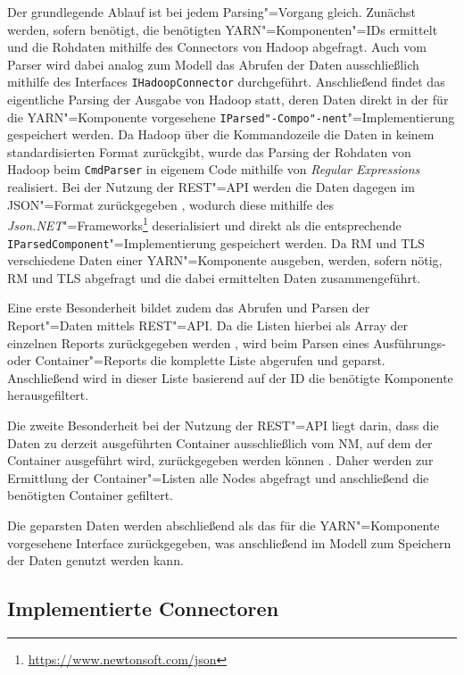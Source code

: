 Der grundlegende Ablauf ist bei jedem Parsing"=Vorgang gleich.
Zunächst werden, sofern benötigt, die benötigten YARN"=Komponenten"=IDs ermittelt und die Rohdaten mithilfe des Connectors von Hadoop abgefragt.
Auch vom Parser wird dabei analog zum Modell das Abrufen der Daten ausschließlich mithilfe des Interfaces \texttt{IHadoopConnector} durchgeführt.
Anschließend findet das eigentliche Parsing der Ausgabe von Hadoop statt, deren Daten direkt in der für die YARN"=Komponente vorgesehene \texttt{IParsed"-Compo"-nent}"=Implementierung gespeichert werden.
Da Hadoop über die Kommandozeile die Daten in keinem standardisierten Format zurückgibt, wurde das Parsing der Rohdaten von Hadoop beim \texttt{CmdParser} in eigenem Code mithilfe von \emph{Regular Expressions} realisiert.
Bei der Nutzung der REST"=API werden die Daten dagegen im JSON"=Format zurückgegeben \cite{HadoopYarnTlServer271,HadoopRmApi271,HadoopNmApi271}, wodurch diese mithilfe des \emph{Json.NET}"=Frameworks\footnote{\url{https://www.newtonsoft.com/json}} deserialisiert und direkt als die entsprechende \texttt{IParsedComponent}"=Implementierung gespeichert werden.
Da \ac{RM} und \ac{TLS} verschiedene Daten einer YARN"=Komponente ausgeben, werden, sofern nötig, \ac{RM} und \ac{TLS} abgefragt und die dabei ermittelten Daten zusammengeführt.

Eine erste Besonderheit bildet zudem das Abrufen und Parsen der Report"=Daten mittels REST"=API.
Da die Listen hierbei als Array der einzelnen Reports zurückgegeben werden \cite{HadoopYarnTlServer271,HadoopRmApi271,HadoopNmApi271}, wird beim Parsen eines Ausführungs- oder Container"=Reports die komplette Liste abgerufen und geparst.
Anschließend wird in dieser Liste basierend auf der ID die benötigte Komponente herausgefiltert.

Die zweite Besonderheit bei der Nutzung der REST"=API liegt darin, dass die Daten zu derzeit ausgeführten Container ausschließlich vom \ac{NM}, auf dem der Container ausgeführt wird, zurückgegeben werden können \cite{HadoopRmApi271,HadoopNmApi271}.
Daher werden zur Ermittlung der Container"=Listen alle Nodes abgefragt und anschließend die benötigten Container gefiltert.

Die geparsten Daten werden abschließend als das für die YARN"=Komponente vorgesehene Interface zurückgegeben, was anschließend im Modell zum Speichern der Daten genutzt werden kann.

\subsection{Implementierte Connectoren}\label{sec:implementedConnectors}

